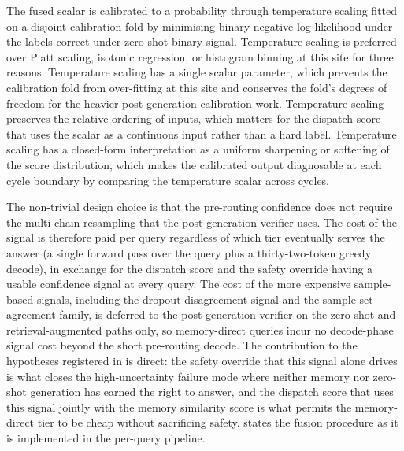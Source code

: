 The fused scalar is calibrated to a probability through temperature scaling \cite{pmlr-v70-guo17a} fitted on a disjoint calibration fold by minimising binary negative-log-likelihood under the labels-correct-under-zero-shot binary signal. Temperature scaling is preferred over Platt scaling, isotonic regression, or histogram binning at this site for three reasons. Temperature scaling has a single scalar parameter, which prevents the calibration fold from over-fitting at this site and conserves the fold's degrees of freedom for the heavier post-generation calibration work. Temperature scaling preserves the relative ordering of inputs, which matters for the dispatch score that uses the scalar as a continuous input rather than a hard label. Temperature scaling has a closed-form interpretation as a uniform sharpening or softening of the score distribution, which makes the calibrated output diagnosable at each cycle boundary by comparing the temperature scalar across cycles.

The non-trivial design choice is that the pre-routing confidence does not require the multi-chain resampling that the post-generation verifier uses. The cost of the signal is therefore paid per query regardless of which tier eventually serves the answer (a single forward pass over the query plus a thirty-two-token greedy decode), in exchange for the dispatch score and the safety override having a usable confidence signal at every query. The cost of the more expensive sample-based signals, including the dropout-disagreement signal and the sample-set agreement family, is deferred to the post-generation verifier on the zero-shot and retrieval-augmented paths only, so memory-direct queries incur no decode-phase signal cost beyond the short pre-routing decode. The contribution to the hypotheses registered in  is direct: the safety override that this signal alone drives is what closes the high-uncertainty failure mode where neither memory nor zero-shot generation has earned the right to answer, and the dispatch score that uses this signal jointly with the memory similarity score is what permits the memory-direct tier to be cheap without sacrificing safety.  states the fusion procedure as it is implemented in the per-query pipeline.

